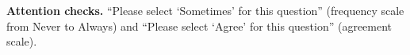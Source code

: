 \documentclass[conference,compsoc]{IEEEtran}
\begin{document}
\textbf{Attention checks.} ``Please select `Sometimes' for this question''
(frequency scale from Never to Always) and ``Please select `Agree' for
this question'' (agreement scale).



\end{document}
